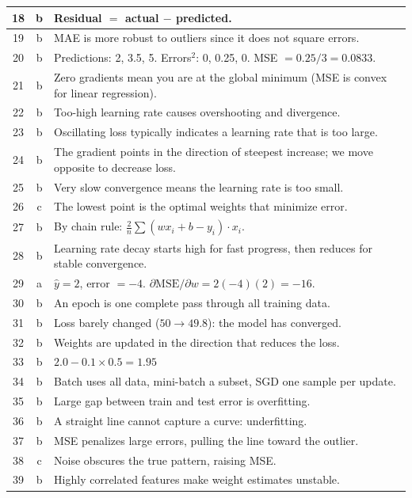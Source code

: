 \documentclass[12pt, a4paper]{article}
\begin{document}
\begin{longtable}{|c|c|p{9.5cm}|}
\hline
18 & b & Residual $=$ actual $-$ predicted. \\
\hline
19 & b & MAE is more robust to outliers since it does not square errors. \\
\hline
20 & b & Predictions: 2, 3.5, 5. Errors$^2$: 0, 0.25, 0. MSE $= 0.25/3 = 0.0833$. \\
\hline
21 & b & Zero gradients mean you are at the global minimum (MSE is convex for linear regression). \\
\hline
22 & b & Too-high learning rate causes overshooting and divergence. \\
\hline
23 & b & Oscillating loss typically indicates a learning rate that is too large. \\
\hline
24 & b & The gradient points in the direction of steepest increase; we move opposite to decrease loss. \\
\hline
25 & b & Very slow convergence means the learning rate is too small. \\
\hline
26 & c & The lowest point is the optimal weights that minimize error. \\
\hline
27 & b & By chain rule: $\frac{2}{n}\sum(wx_i + b - y_i) \cdot x_i$. \\
\hline
28 & b & Learning rate decay starts high for fast progress, then reduces for stable convergence. \\
\hline
29 & a & $\hat{y}=2$, error $= -4$. $\partial\text{MSE}/\partial w = 2(-4)(2) = -16$. \\
\hline
30 & b & An epoch is one complete pass through all training data. \\
\hline
31 & b & Loss barely changed ($50 \to 49.8$): the model has converged. \\
\hline
32 & b & Weights are updated in the direction that reduces the loss. \\
\hline
33 & b & $2.0 - 0.1 \times 0.5 = 1.95$ \\
\hline
34 & b & Batch uses all data, mini-batch a subset, SGD one sample per update. \\
\hline
35 & b & Large gap between train and test error is overfitting. \\
\hline
36 & b & A straight line cannot capture a curve: underfitting. \\
\hline
37 & b & MSE penalizes large errors, pulling the line toward the outlier. \\
\hline
38 & c & Noise obscures the true pattern, raising MSE. \\
\hline
39 & b & Highly correlated features make weight estimates unstable. \\

\end{longtable}
\end{document}
